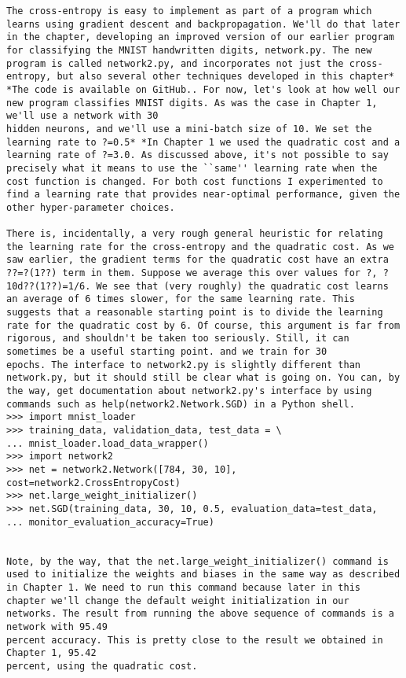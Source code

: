 \begin{lstlisting}
The cross-entropy is easy to implement as part of a program which learns using gradient descent and backpropagation. We'll do that later in the chapter, developing an improved version of our earlier program for classifying the MNIST handwritten digits, network.py. The new program is called network2.py, and incorporates not just the cross-entropy, but also several other techniques developed in this chapter* *The code is available on GitHub.. For now, let's look at how well our new program classifies MNIST digits. As was the case in Chapter 1, we'll use a network with 30
hidden neurons, and we'll use a mini-batch size of 10. We set the learning rate to ?=0.5* *In Chapter 1 we used the quadratic cost and a learning rate of ?=3.0. As discussed above, it's not possible to say precisely what it means to use the ``same'' learning rate when the cost function is changed. For both cost functions I experimented to find a learning rate that provides near-optimal performance, given the other hyper-parameter choices. 

There is, incidentally, a very rough general heuristic for relating the learning rate for the cross-entropy and the quadratic cost. As we saw earlier, the gradient terms for the quadratic cost have an extra ??=?(1??) term in them. Suppose we average this over values for ?, ?10d??(1??)=1/6. We see that (very roughly) the quadratic cost learns an average of 6 times slower, for the same learning rate. This suggests that a reasonable starting point is to divide the learning rate for the quadratic cost by 6. Of course, this argument is far from rigorous, and shouldn't be taken too seriously. Still, it can sometimes be a useful starting point. and we train for 30
epochs. The interface to network2.py is slightly different than network.py, but it should still be clear what is going on. You can, by the way, get documentation about network2.py's interface by using commands such as help(network2.Network.SGD) in a Python shell.
>>> import mnist_loader
>>> training_data, validation_data, test_data = \
... mnist_loader.load_data_wrapper()
>>> import network2
>>> net = network2.Network([784, 30, 10], cost=network2.CrossEntropyCost)
>>> net.large_weight_initializer()
>>> net.SGD(training_data, 30, 10, 0.5, evaluation_data=test_data,
... monitor_evaluation_accuracy=True)


Note, by the way, that the net.large_weight_initializer() command is used to initialize the weights and biases in the same way as described in Chapter 1. We need to run this command because later in this chapter we'll change the default weight initialization in our networks. The result from running the above sequence of commands is a network with 95.49
percent accuracy. This is pretty close to the result we obtained in Chapter 1, 95.42
percent, using the quadratic cost.


\end{lstlisting}
